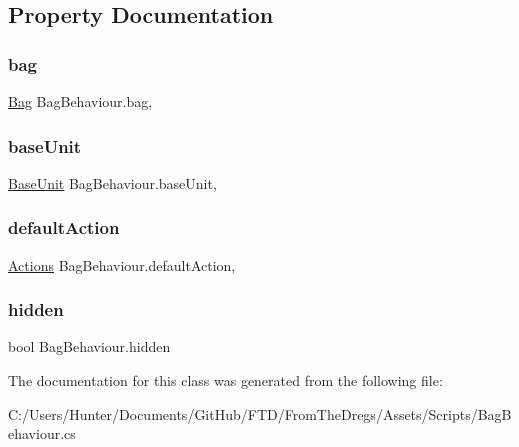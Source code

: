 \subsection{Property Documentation}
\mbox{\label{class_bag_behaviour_a2ce7c6b9e26738b42f953a3351b8b1b4}} 
\subsubsection{\texorpdfstring{bag}{bag}}
{\footnotesize\ttfamily \mbox{\hyperlink{class_bag}{Bag}} Bag\+Behaviour.\+bag\hspace{0.3cm}{\ttfamily [get]}, {\ttfamily [set]}}

\mbox{\label{class_bag_behaviour_a902e05fcee6312ba24825f3d9f785b8b}} 
\subsubsection{\texorpdfstring{baseUnit}{baseUnit}}
{\footnotesize\ttfamily \mbox{\hyperlink{class_base_unit}{Base\+Unit}} Bag\+Behaviour.\+base\+Unit\hspace{0.3cm}{\ttfamily [get]}, {\ttfamily [set]}}

\mbox{\label{class_bag_behaviour_aee692afcced72398af07f9df77990b09}} 
\subsubsection{\texorpdfstring{defaultAction}{defaultAction}}
{\footnotesize\ttfamily \mbox{\hyperlink{class_bag_behaviour_aeafbbbda3c9a34d1a73647a8b274788c}{Actions}} Bag\+Behaviour.\+default\+Action\hspace{0.3cm}{\ttfamily [get]}, {\ttfamily [set]}}

\mbox{\label{class_bag_behaviour_a20616261b25fffc37c9b9d68c3994bbe}} 
\subsubsection{\texorpdfstring{hidden}{hidden}}
{\footnotesize\ttfamily bool Bag\+Behaviour.\+hidden\hspace{0.3cm}{\ttfamily [get]}}



The documentation for this class was generated from the following file\+:\begin{DoxyCompactItemize}
\item 
C\+:/\+Users/\+Hunter/\+Documents/\+Git\+Hub/\+F\+T\+D/\+From\+The\+Dregs/\+Assets/\+Scripts/Bag\+Behaviour.\+cs\end{DoxyCompactItemize}
